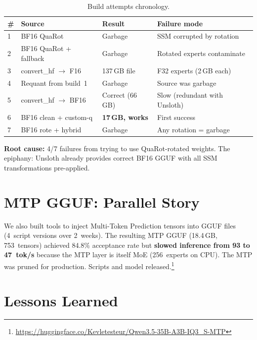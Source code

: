 \documentclass[10pt,a4paper]{article}
\begin{document}
\begin{table}[h]
\centering
\caption{Build attempts chronology.}
\small
\begin{tabular}{llll}
\toprule
\textbf{\#} & \textbf{Source} & \textbf{Result} & \textbf{Failure mode} \\
\midrule
1 & BF16 QuaRot & Garbage & SSM corrupted by rotation \\
2 & BF16 QuaRot + fallback & Garbage & Rotated experts contaminate \\
3 & convert\_hf $\to$ F16 & 137\,GB file & F32 experts (2\,GB each) \\
4 & Requant from build~1 & Garbage & Source was garbage \\
5 & convert\_hf $\to$ BF16 & Correct (66\,GB) & Slow (redundant with Unsloth) \\
6 & BF16 clean + custom-q & \textbf{17\,GB, works} & First success \\
7 & BF16 rote + hybrid & Garbage & Any rotation = garbage \\
\bottomrule
\end{tabular}
\label{tab:builds}
\end{table}

\textbf{Root cause:} 4/7 failures from trying to use QuaRot-rotated weights. The epiphany: Unsloth already provides correct BF16 GGUF with all SSM transformations pre-applied.

\section{MTP GGUF: Parallel Story}

We also built tools to inject Multi-Token Prediction tensors into GGUF files (4~script versions over 2~weeks). The resulting MTP GGUF (18.4\,GB, 753~tensors) achieved 84.8\% acceptance rate but \textbf{slowed inference from 93 to 47~tok/s} because the MTP layer is itself MoE (256~experts on CPU). The MTP was pruned for production. Scripts and model released.\footnote{\url{https://huggingface.co/Kevletesteur/Qwen3.5-35B-A3B-IQ3_S-MTP}}

\section{Lessons Learned}
\end{document}
